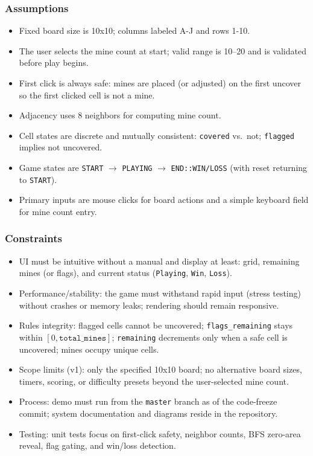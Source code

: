 \documentclass[11pt]{article}
\begin{document}
\subsubsection*{Assumptions}
\begin{itemize}
  \item Fixed board size is 10x10; columns labeled A-J and rows 1-10.
  \item The user selects the mine count at start; valid range is 10--20 and is validated before play begins.
  \item First click is always safe: mines are placed (or adjusted) on the first uncover so the first clicked cell is not a mine.
  \item Adjacency uses 8 neighbors for computing mine count.
  \item Cell states are discrete and mutually consistent: \texttt{covered} vs.\ not; \texttt{flagged} implies not uncovered.
  \item Game states are \texttt{START} $\rightarrow$ \texttt{PLAYING} $\rightarrow$ \texttt{END::WIN/LOSS} (with reset returning to \texttt{START}).
  \item Primary inputs are mouse clicks for board actions and a simple keyboard field for mine count entry.
\end{itemize}

\subsubsection*{Constraints}
\begin{itemize}
  \item UI must be intuitive without a manual and display at least: grid, remaining mines (or flags), and current status (\texttt{Playing}, \texttt{Win}, \texttt{Loss}).
  \item Performance/stability: the game must withstand rapid input (stress testing) without crashes or memory leaks; rendering should remain responsive.
  \item Rules integrity: flagged cells cannot be uncovered; \texttt{flags\_remaining} stays within $[0, \texttt{total\_mines}]$; \texttt{remaining} decrements only when a safe cell is uncovered; mines occupy unique cells.
  \item Scope limits (v1): only the specified 10x10 board; no alternative board sizes, timers, scoring, or difficulty presets beyond the user-selected mine count.
  \item Process: demo must run from the \texttt{master} branch as of the code-freeze commit; system documentation and diagrams reside in the repository.
  \item Testing: unit tests focus on first-click safety, neighbor counts, BFS zero-area reveal, flag gating, and win/loss detection.
\end{itemize}
\end{document}
